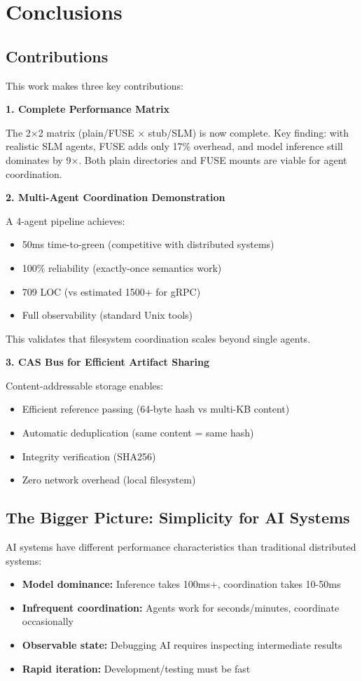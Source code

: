 \documentclass[11pt]{article}
\begin{document}
\section{Conclusions}

\subsection{Contributions}

This work makes three key contributions:

\textbf{1. Complete Performance Matrix}

The 2×2 matrix (plain/FUSE × stub/SLM) is now complete. Key finding: with realistic SLM agents, FUSE adds only 17\% overhead, and model inference still dominates by 9×. Both plain directories and FUSE mounts are viable for agent coordination.

\textbf{2. Multi-Agent Coordination Demonstration}

A 4-agent pipeline achieves:
\begin{itemize}
\item 50ms time-to-green (competitive with distributed systems)
\item 100\% reliability (exactly-once semantics work)
\item 709 LOC (vs estimated 1500+ for gRPC)
\item Full observability (standard Unix tools)
\end{itemize}

This validates that filesystem coordination scales beyond single agents.

\textbf{3. CAS Bus for Efficient Artifact Sharing}

Content-addressable storage enables:
\begin{itemize}
\item Efficient reference passing (64-byte hash vs multi-KB content)
\item Automatic deduplication (same content = same hash)
\item Integrity verification (SHA256)
\item Zero network overhead (local filesystem)
\end{itemize}

\subsection{The Bigger Picture: Simplicity for AI Systems}

AI systems have different performance characteristics than traditional distributed systems:
\begin{itemize}
\item \textbf{Model dominance:} Inference takes 100ms+, coordination takes 10-50ms
\item \textbf{Infrequent coordination:} Agents work for seconds/minutes, coordinate occasionally
\item \textbf{Observable state:} Debugging AI requires inspecting intermediate results
\item \textbf{Rapid iteration:} Development/testing must be fast
\end{itemize}
\end{document}
